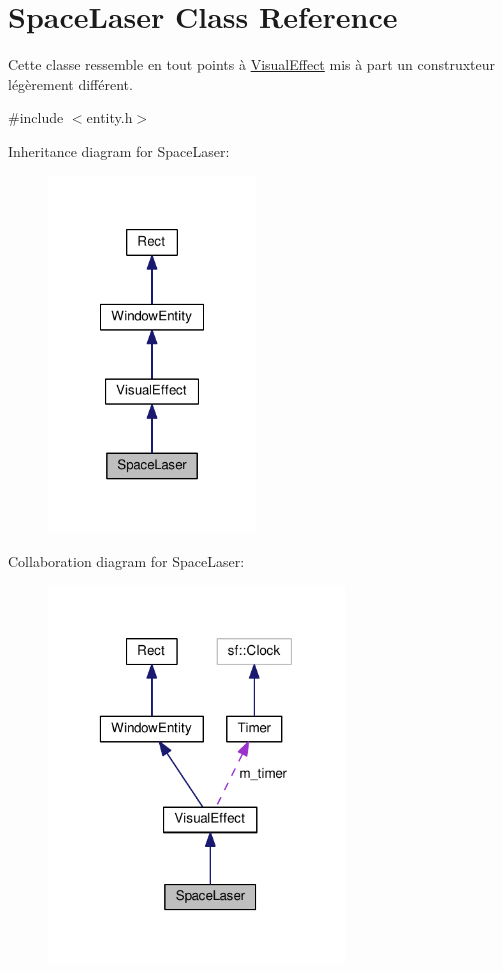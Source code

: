 \hypertarget{class_space_laser}{\section{Space\-Laser Class Reference}
\label{class_space_laser}
}


Cette classe ressemble en tout points à \hyperlink{class_visual_effect}{Visual\-Effect} mis à part un construxteur légèrement différent.  




{\ttfamily \#include $<$entity.\-h$>$}



Inheritance diagram for Space\-Laser\-:\nopagebreak
\begin{figure}[H]
\begin{center}
\leavevmode
\includegraphics[width=156pt]{class_space_laser__inherit__graph}
\end{center}
\end{figure}


Collaboration diagram for Space\-Laser\-:\nopagebreak
\begin{figure}[H]
\begin{center}
\leavevmode
\includegraphics[width=223pt]{class_space_laser__coll__graph}
\end{center}
\end{figure}
